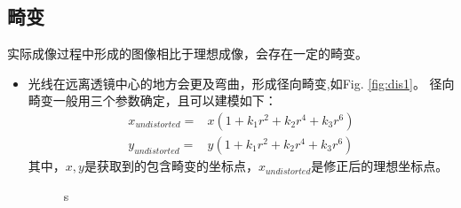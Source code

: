 \documentclass[10pt,a4paper]{article}
\begin{document}
\begin{CJK*}{UTF8}{gbsn}
\subsection{畸变}
实际成像过程中形成的图像相比于理想成像，会存在一定的畸变。
\begin{itemize}
    \item 
        光线在远离透镜中心的地方会更及弯曲，形成径向畸变,如Fig. \ref{fig:dis1}。
        径向畸变一般用三个参数确定，且可以建模如下：
        \begin{equation}
            \label{eq:dis1}
            \begin{aligned}
                x_{undistorted} =& x( 1 + k_1 r^2 + k_2 r^4 + k_3 r^6) \\ 
                y_{undistorted} =& y( 1 + k_1 r^2 + k_2 r^4 + k_3 r^6)
            \end{aligned}
        \end{equation}
        其中，$x,y$是获取到的包含畸变的坐标点，$x_{undistorted}$是修正后的理想坐标点。
        \begin{figure}[htbp]
            \centering
            s

\end{figure}
\end{itemize}
\end{CJK*}
\end{document}
